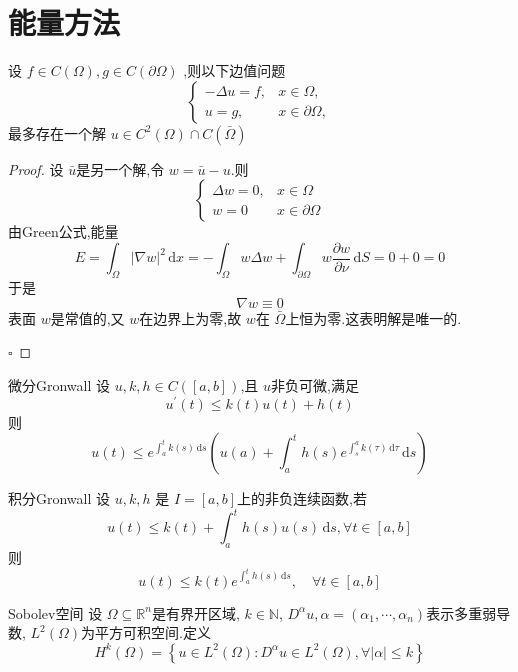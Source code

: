 \documentclass[../../main.tex]{subfiles}
\begin{document}
\chapter{ 能量方法 }

\begin{theorem}
    设 \(  f \in C\left(  \Omega  \right),g \in C\left(  \partial  \Omega  \right)    \) ,则以下边值问题 \[
    \begin{cases} - \Delta u= f,& x \in  \Omega ,\\ 
     u= g,& x\in  \partial  \Omega ,\end{cases} 
    \]最多存在一个解 \(  u \in C^{2}\left(  \Omega  \right)\cap C\left(  \bar{\Omega} \right)    \) 
\end{theorem}
\begin{proof}
    设 \(  \bar{u}  \)是另一个解,令 \(  w= \bar{u}-u  \).则 \[
    \begin{cases}  \Delta w= 0,&x\in  \Omega \\ 
     w= 0&x\in  \partial  \Omega  \end{cases} 
    \]由Green公式,能量 \[
    E=  \int_{ \Omega } \left|  \nabla w \right|^{2}\,\mathrm{d} x=  - \int_{ \Omega }w  \Delta w+ \int_{ \partial  \Omega }w \frac{\partial w}{\partial \nu }\,\mathrm{d} S= 0+ 0= 0
    \]于是 \[
     \nabla w\equiv 0
    \]表面 \(  w  \)是常值的,又  \(  w  \)在边界上为零,故 \(  w  \)在 \(   \bar{\Omega}  \)上恒为零.这表明解是唯一的.    

    \hfill $\square$
\end{proof}
\begin{lemma}{微分Gronwall}
    设 \(  u,k,h \in C\left( \left[ a,b \right]  \right)   \),且 \(  u  \)非负可微,满足 \[
    u^{\prime} \left( t \right)\le k\left( t \right)u\left( t \right)+ h\left( t \right)    
    \]则 \[
    u\left( t \right)\le  e^{\int_{a}^{t}k\left( s \right)\,\mathrm{d} s }\left( u\left( a \right)+  \int_{a}^{t}h\left( s \right)e^{\int_{s}^{a}k\left( \tau  \right)\,\mathrm{d} \tau  }\,\mathrm{d} s   \right)  
    \]
\end{lemma}

\begin{lemma}{积分Gronwall}
    设 \(  u,k,h  \) 是 \(  I  = [a,b]\)上的非负连续函数,若 \[
u\left( t \right)\le k\left( t \right)+ \int_{a}^{t} h\left( s \right)u\left( s \right)\,\mathrm{d} s, \forall t\in \left[ a,b \right]    
\] 则 \[
u\left( t \right)\le k\left( t \right)e^{\int_{a}^{t}h\left( s \right)\,\mathrm{d} s },\quad \forall t\in \left[ a,b \right]   
\]
\end{lemma}
\begin{definition}{Sobolev空间}
    设 \(   \Omega \subseteq \mathbb{R} ^{n}  \)是有界开区域, \(  k \in \mathbb{N}   \), \(  D^{\alpha }u,\alpha = \left( \alpha _1 ,\cdots ,\alpha _{n} \right)   \)表示多重弱导数, \(  L^{2}\left(  \Omega  \right)   \)为平方可积空间.定义 \[
    H^{k}\left(  \Omega  \right)= \left\{ u\in L^{2}\left(  \Omega  \right): D^{\alpha }u\in L^{2}\left(  \Omega  \right), \forall \left| \alpha  \right|\le k    \right\} 
    \]    
\end{definition}
\end{document}
